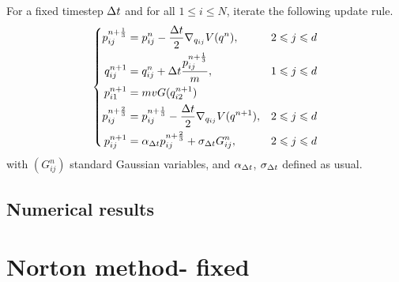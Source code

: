\begin{algorithm}
    For a fixed timestep ${\Delta t}$ and for all $1\leq i\leq N$, iterate the following update rule.
    \begin{equation}
        \left\{
            \begin{aligned}
                p_{ij}^{n+\frac13}&=p_{ij}^n-\frac{{\Delta t}}2\nabla_{q_{ij}}V(q^n),&2\leqslant j\leqslant d \\
                q_{ij}^{n+1}&=q_{ij}^n+{\Delta t} \frac{p_{ij}^{n+\frac13}}{m},&1\leqslant j\leqslant d \\
                p_{i1}^{n+1}&=mvG(q_{i2}^{n+1})\\
                p_{ij}^{n+\frac23}&=p_{ij}^{n+\frac13}-\frac{{\Delta t}}2\nabla_{q_{ij}}V(q^{n+1}),&2\leqslant j\leqslant d \\
                p_{ij}^{n+1}&=\alpha_{{\Delta t}}p_{ij}^{n+\frac23}+\sigma_{{\Delta t}}G_{ij}^n,&2\leqslant j\leqslant d\\
            \end{aligned}
        \right.
    \end{equation}
    with $(G_{ij}^n)$ \iid standard Gaussian variables, and $\alpha_{{\Delta t}}$, $\sigma_{{\Delta t}}$ defined as usual.
\end{algorithm}

\subsection{Numerical results}

\section{Norton method- fixed}
